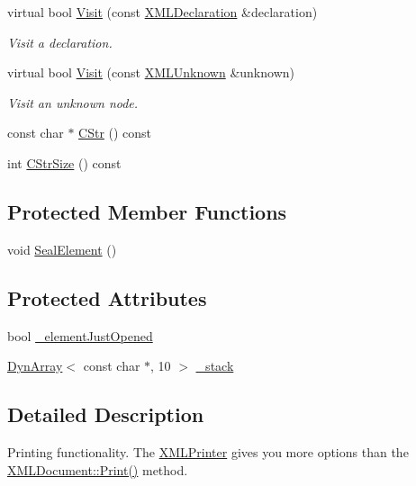 \begin{DoxyCompactItemize}
virtual bool \hyperlink{classtinyxml2_1_1_x_m_l_printer_acfc625b2549304b9c7eb85ebd5c5eb39}{Visit} (const \hyperlink{classtinyxml2_1_1_x_m_l_declaration}{X\-M\-L\-Declaration} \&declaration)
\begin{DoxyCompactList}\small\item\em Visit a declaration. \end{DoxyCompactList}\item 
virtual bool \hyperlink{classtinyxml2_1_1_x_m_l_printer_ab8af5455bbf9e4be2663e6642fcd7e32}{Visit} (const \hyperlink{classtinyxml2_1_1_x_m_l_unknown}{X\-M\-L\-Unknown} \&unknown)
\begin{DoxyCompactList}\small\item\em Visit an unknown node. \end{DoxyCompactList}\item 
const char $\ast$ \hyperlink{classtinyxml2_1_1_x_m_l_printer_a4a1b788e11b540921ec50687cd2b24a9}{C\-Str} () const 
\item 
int \hyperlink{classtinyxml2_1_1_x_m_l_printer_a02c3c5f8c6c007dcbaf10595d9e22bf0}{C\-Str\-Size} () const 
\end{DoxyCompactItemize}
\subsection*{Protected Member Functions}
\begin{DoxyCompactItemize}
\item 
void \hyperlink{classtinyxml2_1_1_x_m_l_printer_a70ac2010150c8551773ffb2f96fef353}{Seal\-Element} ()
\end{DoxyCompactItemize}
\subsection*{Protected Attributes}
\begin{DoxyCompactItemize}
\item 
bool \hyperlink{classtinyxml2_1_1_x_m_l_printer_ac07169d58b465214a2b1fa306e617c26}{\-\_\-element\-Just\-Opened}
\item 
\hyperlink{classtinyxml2_1_1_dyn_array}{Dyn\-Array}$<$ const char $\ast$, 10 $>$ \hyperlink{classtinyxml2_1_1_x_m_l_printer_a99d59e67e084714541bee3ae43884bef}{\-\_\-stack}
\end{DoxyCompactItemize}


\subsection{Detailed Description}
Printing functionality. The \hyperlink{classtinyxml2_1_1_x_m_l_printer}{X\-M\-L\-Printer} gives you more options than the \hyperlink{classtinyxml2_1_1_x_m_l_document_a686ea28672c0e0c60383ec28148c1ac0}{X\-M\-L\-Document\-::\-Print()} method.

